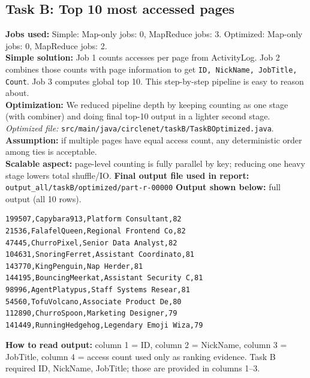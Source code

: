 \documentclass[11pt]{article}
\begin{document}
\subsection*{Task B: Top 10 most accessed pages}
\textbf{Jobs used:} Simple: Map-only jobs: 0, MapReduce jobs: 3. Optimized: Map-only jobs: 0, MapReduce jobs: 2.\\
\textbf{Simple solution:} Job 1 counts accesses per page from ActivityLog. Job 2 combines those counts with page information to get \texttt{ID, NickName, JobTitle, Count}. Job 3 computes global top 10. This step-by-step pipeline is easy to reason about.\\
\textbf{Optimization:} We reduced pipeline depth by keeping counting as one stage (with combiner) and doing final top-10 output in a lighter second stage. \textit{Optimized file:} \texttt{src/main/java/circlenet/taskB/TaskBOptimized.java}.\\
\textbf{Assumption:} if multiple pages have equal access count, any deterministic order among ties is acceptable.\\
\textbf{Scalable aspect:} page-level counting is fully parallel by key; reducing one heavy stage lowers total shuffle/IO.
\textbf{Final output file used in report:} \texttt{output\_all/taskB/optimized/part-r-00000}
\textbf{Output shown below:} full output (all 10 rows).
\begin{lstlisting}
199507,Capybara913,Platform Consultant,82
21536,FalafelQueen,Regional Frontend Co,82
47445,ChurroPixel,Senior Data Analyst,82
104631,SnoringFerret,Assistant Coordinato,81
143770,KingPenguin,Nap Herder,81
144195,BouncingMeerkat,Assistant Security C,81
98996,AgentPlatypus,Staff Systems Resear,81
54560,TofuVolcano,Associate Product De,80
112890,ChurroSpoon,Marketing Designer,79
141449,RunningHedgehog,Legendary Emoji Wiza,79
\end{lstlisting}
\textbf{How to read output:} column 1 = ID, column 2 = NickName, column 3 = JobTitle, column 4 = access count used only as ranking evidence. Task B required ID, NickName, JobTitle; those are provided in columns 1--3.
\end{document}
